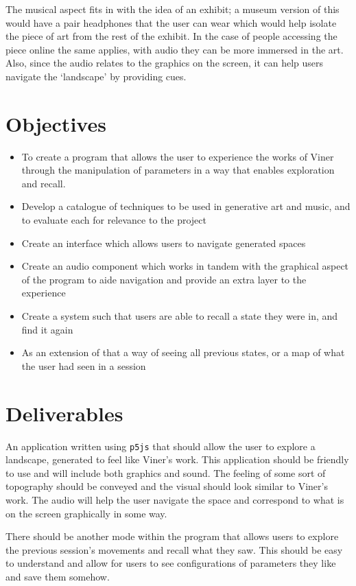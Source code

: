 The musical aspect fits in with the idea of an exhibit; a museum version of this
would have a pair headphones that the user can wear which would help isolate the
piece of art from the rest of the exhibit. In the case of people accessing the
piece online the same applies, with audio they can be more immersed in the art.
Also, since the audio relates to the graphics on the screen, it can help users
navigate the `landscape' by providing cues.

\section{Objectives}
\begin{itemize}
    \item To create a program that allows the user to experience the works of
        Viner through the manipulation of parameters in a way that enables
        exploration and recall.
    \item Develop a catalogue of techniques to be used in generative art and
        music, and to evaluate each for relevance to the project
    \item Create an interface which allows users to navigate generated spaces
    \item Create an audio component which works in tandem with the graphical aspect
        of the program to aide navigation and provide an extra layer to the
        experience
    \item Create a system such that users are able to recall a state they were
        in, and find it again
    \item As an extension of that a way of seeing all previous states, or a map
        of what the user had seen in a session
\end{itemize}

\section{Deliverables}
An application written using \verb|p5js| that should allow the user to explore a
landscape, generated to feel like Viner's work. This application should be
friendly to use and will include both graphics and sound. The feeling of some
sort of topography should be conveyed and the visual should look similar to
Viner's work. The audio will help the user navigate the space and correspond to
what is on the screen graphically in some way.

There should be another mode within the program that allows users to explore the
previous session's movements and recall what they saw. This should be easy to
understand and allow for users to see configurations of parameters they like and
save them somehow.

